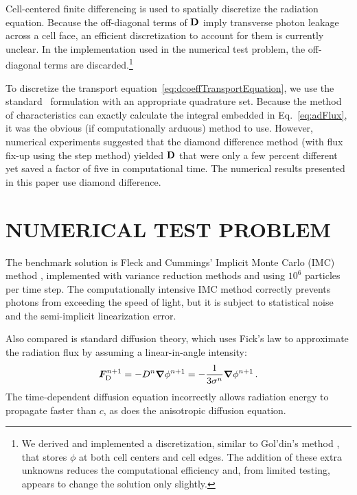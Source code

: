 \documentclass[11pt,letter,twoside]{mc2011}
\begin{document}
Cell-centered finite differencing is used to spatially discretize the radiation
equation. Because the off-diagonal terms of $\mathbf{D}$ imply transverse photon
leakage across a cell face, an efficient discretization to account for them is
currently unclear. In the implementation used in the numerical test problem,
the off-diagonal terms are discarded.\footnote{We derived and implemented a
discretization, similar to Gol'din's method \cite{Wie2009}, that stores $\phi$ at both cell centers and
cell edges. The addition of these extra unknowns reduces the computational
efficiency and, from limited testing, appears to change the solution only
slightly.}

To discretize the transport equation~\eqref{eq:dcoeffTransportEquation}, we use
the standard \SN\ formulation with an appropriate quadrature set. Because the
method of characteristics \cite{Ask1982} can exactly calculate the
integral embedded in Eq.~\eqref{eq:adFlux}, it was the obvious (if
computationally arduous) method to use. However, numerical experiments
suggested that the diamond difference method (with flux fix-up using the step
method) yielded $\mathbf{D}$ that were only a few percent different yet saved a
factor of five in computational time. The numerical results presented in this
paper use diamond difference.

\section{\MakeUppercase{Numerical Test Problem}}

The benchmark solution is Fleck and Cummings' Implicit Monte Carlo
(IMC) method \cite{Fle1971}, implemented
with variance reduction methods and using $10^6$ particles per time step. The
computationally intensive IMC method
correctly prevents photons from exceeding the speed of light, but it is subject
to statistical noise and the semi-implicit linearization error.

Also compared is standard diffusion theory, which uses Fick's law to
approximate the radiation flux by assuming a linear-in-angle intensity:
\begin{equation*}
  \bm{F}_\text{D}^{n+1} = - D^{n} \bm{\nabla} \phi^{n+1} 
  = -\frac{1}{3\sigma^{n}} \bm{\nabla} \phi^{n+1}\,.
\end{equation*}
The time-dependent diffusion equation incorrectly allows radiation energy to
propagate faster than $c$, as does the anisotropic diffusion equation.
\end{document}
